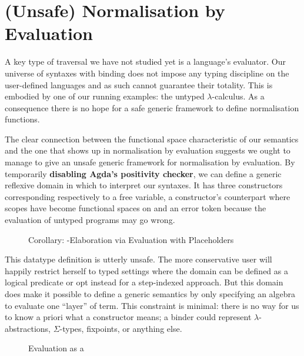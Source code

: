 \section{(Unsafe) Normalisation by Evaluation}\label{section:unsafenbyeval}

A key type of traversal we have not studied yet is a language's evaluator. Our
universe of syntaxes with binding does not impose any typing discipline on the
user-defined languages and as such cannot guarantee their totality. This is
embodied by one of our running examples: the untyped $\lambda$-calculus. As a
consequence there is no hope for a safe generic framework to define normalisation
functions.

The clear connection between the  functional space characteristic of
our semantics and the one that shows up in normalisation by evaluation suggests
we ought to manage to give an unsafe generic framework for normalisation by evaluation.
By temporarily \textbf{disabling Agda's positivity checker}, we can define a
generic reflexive domain  in which to interpret our syntaxes. It has three
constructors corresponding respectively to a free variable, a constructor's
counterpart where scopes have become  functional spaces on 
and an error token because the evaluation of untyped programs may go wrong.

\begin{figure}[h]
\caption{Corollary: -Elaboration via Evaluation with Placeholders}
\end{figure}

This datatype definition is utterly unsafe. The more conservative user will happily
restrict herself to typed settings where the domain can be defined as a logical
predicate or opt instead for a step-indexed approach. But this domain does make it
possible to define a generic  semantics by only specifying an algebra to
evaluate one ``layer'' of term. This constraint is minimal: there is no way for
us to know a priori what a constructor means; a binder could represent
$\lambda$-abstractions, $\Sigma$-types, fixpoints, or anything else.

\begin{figure}[h]
\caption{Evaluation as a }
\end{figure}

